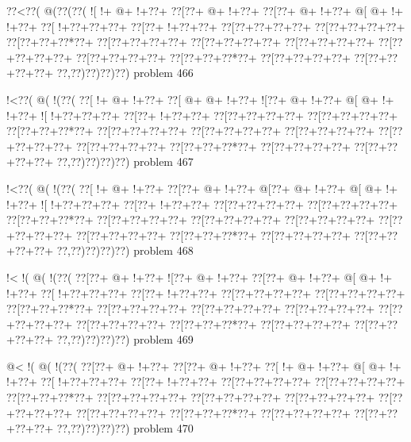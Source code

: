 \vbox{\vbox{\goo
\0??<\0??(\- @(\0??(\0??(
\- ![\- !+\- @+\- !+\0??+
\0??[\0??+\- @+\- !+\0??+
\0??[\0??+\- @+\- !+\0??+
\- @[\- @+\- !+\- !+\0??+
\0??[\- !+\0??+\0??+\0??+
\0??[\0??+\- !+\0??+\0??+
\0??[\0??+\0??+\0??+\0??+
\0??[\0??+\0??+\0??+\0??+
\0??[\0??+\0??+\0??*\0??+
\0??[\0??+\0??+\0??+\0??+
\0??[\0??+\0??+\0??+\0??+
\0??[\0??+\0??+\0??+\0??+
\0??[\0??+\0??+\0??+\0??+
\0??[\0??+\0??+\0??+\0??+
\0??[\0??+\0??+\0??*\0??+
\0??[\0??+\0??+\0??+\0??+
\0??[\0??+\0??+\0??+\0??+
\0??,\0??)\0??)\0??)\0??)
}
\hfil problem 466\hfil\break
}

\vbox{\vbox{\goo
\- !<\0??(\- @(\- !(\0??(
\0??[\- !+\- @+\- !+\0??+
\0??[\- @+\- @+\- !+\0??+
\- ![\0??+\- @+\- !+\0??+
\- @[\- @+\- !+\- !+\0??+
\- ![\- !+\0??+\0??+\0??+
\0??[\0??+\- !+\0??+\0??+
\0??[\0??+\0??+\0??+\0??+
\0??[\0??+\0??+\0??+\0??+
\0??[\0??+\0??+\0??*\0??+
\0??[\0??+\0??+\0??+\0??+
\0??[\0??+\0??+\0??+\0??+
\0??[\0??+\0??+\0??+\0??+
\0??[\0??+\0??+\0??+\0??+
\0??[\0??+\0??+\0??+\0??+
\0??[\0??+\0??+\0??*\0??+
\0??[\0??+\0??+\0??+\0??+
\0??[\0??+\0??+\0??+\0??+
\0??,\0??)\0??)\0??)\0??)
}
\hfil problem 467\hfil\break
}

\vbox{\vbox{\goo
\- !<\0??(\- @(\- !(\0??(
\0??[\- !+\- @+\- !+\0??+
\0??[\0??+\- @+\- !+\0??+
\- @[\0??+\- @+\- !+\0??+
\- @[\- @+\- !+\- !+\0??+
\- ![\- !+\0??+\0??+\0??+
\0??[\0??+\- !+\0??+\0??+
\0??[\0??+\0??+\0??+\0??+
\0??[\0??+\0??+\0??+\0??+
\0??[\0??+\0??+\0??*\0??+
\0??[\0??+\0??+\0??+\0??+
\0??[\0??+\0??+\0??+\0??+
\0??[\0??+\0??+\0??+\0??+
\0??[\0??+\0??+\0??+\0??+
\0??[\0??+\0??+\0??+\0??+
\0??[\0??+\0??+\0??*\0??+
\0??[\0??+\0??+\0??+\0??+
\0??[\0??+\0??+\0??+\0??+
\0??,\0??)\0??)\0??)\0??)
}
\hfil problem 468\hfil\break
}

\vbox{\vbox{\goo
\- !<\- !(\- @(\- !(\0??(
\0??[\0??+\- @+\- !+\0??+
\- ![\0??+\- @+\- !+\0??+
\0??[\0??+\- @+\- !+\0??+
\- @[\- @+\- !+\- !+\0??+
\0??[\- !+\0??+\0??+\0??+
\0??[\0??+\- !+\0??+\0??+
\0??[\0??+\0??+\0??+\0??+
\0??[\0??+\0??+\0??+\0??+
\0??[\0??+\0??+\0??*\0??+
\0??[\0??+\0??+\0??+\0??+
\0??[\0??+\0??+\0??+\0??+
\0??[\0??+\0??+\0??+\0??+
\0??[\0??+\0??+\0??+\0??+
\0??[\0??+\0??+\0??+\0??+
\0??[\0??+\0??+\0??*\0??+
\0??[\0??+\0??+\0??+\0??+
\0??[\0??+\0??+\0??+\0??+
\0??,\0??)\0??)\0??)\0??)
}
\hfil problem 469\hfil\break
}

\vbox{\vbox{\goo
\- @<\- !(\- @(\- !(\0??(
\0??[\0??+\- @+\- !+\0??+
\0??[\0??+\- @+\- !+\0??+
\0??[\- !+\- @+\- !+\0??+
\- @[\- @+\- !+\- !+\0??+
\0??[\- !+\0??+\0??+\0??+
\0??[\0??+\- !+\0??+\0??+
\0??[\0??+\0??+\0??+\0??+
\0??[\0??+\0??+\0??+\0??+
\0??[\0??+\0??+\0??*\0??+
\0??[\0??+\0??+\0??+\0??+
\0??[\0??+\0??+\0??+\0??+
\0??[\0??+\0??+\0??+\0??+
\0??[\0??+\0??+\0??+\0??+
\0??[\0??+\0??+\0??+\0??+
\0??[\0??+\0??+\0??*\0??+
\0??[\0??+\0??+\0??+\0??+
\0??[\0??+\0??+\0??+\0??+
\0??,\0??)\0??)\0??)\0??)
}
\hfil problem 470\hfil\break
}

